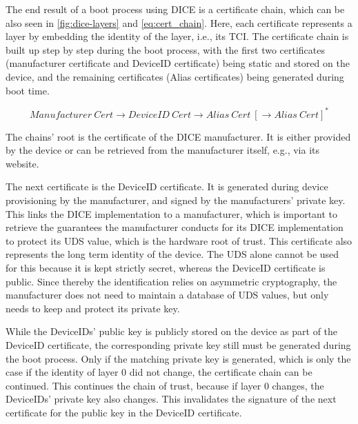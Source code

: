 
The end result of a boot process using DICE is a certificate chain, which can be also seen in \autoref{fig:dice-layers} and \autoref{eq:cert_chain}.
Here, each certificate represents a layer by embedding the identity of the layer, i.e., its TCI\@.
The certificate chain is built up step by step during the boot process, with the first two certificates (manufacturer certificate and DeviceID certificate) being static and stored on the device, and the remaining certificates (Alias certificates) being generated during boot time.

\begin{equation}
  \label{eq:cert_chain}
  Manufacturer\ Cert \rightarrow DeviceID\ Cert \rightarrow Alias\ Cert\ [\rightarrow Alias\ Cert]^*
\end{equation}

The chains' root is the certificate of the DICE manufacturer. It is either provided by the device or can be retrieved from the manufacturer itself, e.g., via its website.


The next certificate is the DeviceID certificate.
It is generated during device provisioning by the manufacturer, and signed by the manufacturers' private key.
This links the DICE implementation to a manufacturer, which is important to retrieve the guarantees the manufacturer conducts for its DICE implementation to protect its UDS value, which is the hardware root of trust.
This certificate also represents the long term identity of the device.
The UDS alone cannot be used for this because it is kept strictly secret, whereas the DeviceID certificate is public.
Since thereby the identification relies on asymmetric cryptography, the manufacturer does not need to maintain a database of UDS values, but only needs to keep and protect its private key.


While the DeviceIDs' public key is publicly stored on the device as part of the DeviceID certificate, the corresponding private key still must be generated during the boot process.
Only if the matching private key is generated, which is only the case if the identity of layer 0 did not change, the certificate chain can be continued.
This continues the chain of trust, because if layer 0 changes, the DeviceIDs' private key also changes.
This invalidates the signature of the next certificate for the public key in the DeviceID certificate.

